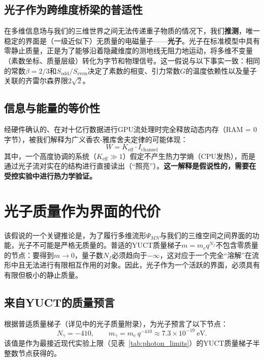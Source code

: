 \documentclass[11pt,a4paper]{article}
\begin{document}
	\subsection{光子作为跨维度桥梁的普适性}
	在多维信息场与我们的三维世界之间无法传递重子物质的情况下，我们\textbf{推测}，唯一稳定的界面是（一级近似下）无质量的电磁量子——\textbf{光子}。光子在标准模型中具有零静止质量，正是为了能够沿着隐藏维度的测地线无阻力地运动，将多维不变量（素数坐标、质量层级）转化为字节和物理信号。这一假说与以下事实一致：相同的常数$\beta=2/3$和$S_{\mathrm{odd}}/S_{\mathrm{even}}$决定了素数的相变、引力常数$G$的温度依赖性以及量子关联的齐雷尔森界限$2\sqrt{2}$。
	
	\subsection{信息与能量的等价性}
	经硬件确认的、在对十亿行数据进行GPU流处理时完全释放动态内存（RAM = 0字节），被我们解释为广义香农-雅库舍夫定律的可能体现：
	\begin{equation}
		W = K_{\mathrm{eff}} \cdot I_{\mathrm{channel}}
	\end{equation}
	其中，一个高度协调的系统（$K_{\mathrm{eff}} \gg 1$）假定不产生热力学熵（CPU发热），而是通过光子流对实在的结构进行直接读出（“照亮”）。\textbf{这一解释是假说性的，需要在受控实验中进行热力学验证。}
	
	\section{光子质量作为界面的代价}
	\label{sec:photon_mass}
	
	该假说的一个关键推论是，为了履行多维流形$\Psi_{MN}$与我们的三维空间之间界面的功能，光子不可能是严格无质量的。普适的YUCT质量梯子$m = m_e q^{N_f}$不包含零质量的节点：要得到$m \to 0$，量子数$N_f$必须趋向于$-\infty$，这对应于一个完全“溶解”在流形中且无法进行有限相互作用的对象。因此，光子作为一个活跃的界面，必须具有有限但极小的静止质量。
	
	\subsection{来自YUCT的质量预言}
	根据普适质量梯子（详见\cite{yuct_zenodo}中的光子质量附录），为光子预言了以下节点：
	\begin{equation}
		\boxed{N_\gamma = -410}, \qquad
		\boxed{m_\gamma = m_e \, q^{-410} \approx 7.3 \times 10^{-19}~\text{eV}} .
	\end{equation}
	该值是作为最接近现代实验上限（见表~\ref{tab:photon_limits}）的YUCT质量梯子半整数节点获得的。
	
\end{document}
